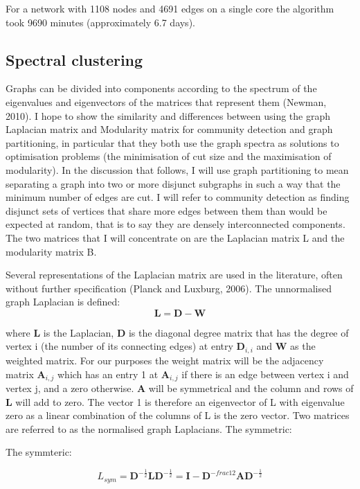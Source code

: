 For a network with 1108 nodes and 4691 edges on a single core the algorithm took 9690 minutes (approximately 6.7 days). \cite{mclean2016improved}


\subsection{Spectral clustering}
Graphs can be divided into components according to the spectrum of the eigenvalues and
eigenvectors of the matrices that represent them (Newman, 2010).
I hope to show the similarity and differences between using the graph Laplacian matrix
and Modularity matrix for community detection and graph partitioning, in particular that
they both use the graph spectra as solutions to optimisation problems (the minimisation
of cut size and the maximisation of modularity).
In the discussion that follows, I will use graph partitioning to mean separating a graph
into two or more disjunct subgraphs in such a way that the minimum number of edges are
cut. I will refer to community detection as finding disjunct sets of vertices that share more
edges between them than would be expected at random, that is to say they are densely
interconnected components.
The two matrices that I will concentrate on are the Laplacian matrix L and the modularity
matrix B.

Several representations of the Laplacian matrix are used in the literature, often without
further specification (Planck and Luxburg, 2006).
The unnormalised graph Laplacian is defined:
\begin{equation}
    \mathbf{L} = \mathbf{D} - \mathbf{W}
\end{equation}

where $\mathbf{L}$ is the Laplacian, $\mathbf{D}$ is the diagonal degree matrix that has the degree of vertex i
(the number of its connecting edges) at entry $\mathbf{D}_{i,i}$ and $\mathbf{W}$ as the weighted matrix.
For our purposes the weight matrix will be the adjacency matrix $\mathbf{A}_{i,j}$ which has an entry
1 at $\mathbf{A}_{i,j}$ if there is an edge between vertex i and vertex j, and a zero otherwise.
$\mathbf{A}$ will be symmetrical and the column and rows of $\mathbf{L}$ will add to zero. The vector 1 is
therefore an eigenvector of L with eigenvalue zero as a linear combination of the columns
of L is the zero vector.
Two matrices are referred to as the normalised graph Laplacians. The symmetric:

The symmteric:

\begin{equation}
{L}_{sym} = \mathbf{D}^{-\frac{1}{2}}\mathbf{L}\mathbf{D}^{-\frac{1}{2}}= \mathbf{I}-\mathbf{D}^{-frac{1}{2}}\mathbf{A}\mathbf{D}^{-\frac{1}{2}}
\end{equation}

